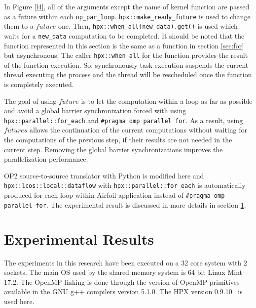 \documentclass[conference]{IEEEtran}
\begin{document}
In  Figure \ref{l4}, all of the arguments except the name of kernel function are passed as a future within each \texttt{op\_par\_loop}. \texttt{hpx::make\_ready\_future} is used to change them to a $future$ one. Then, \texttt{hpx::when\_all(new\_data).get()} is used which waits for a \texttt{new\_data} computation to be completed. It should be noted that the function represented in this section is the same as a function in section \ref{sec:for} but asynchronous. The caller \texttt{hpx::when\_all} for the function provides the result of the function execution. So, synchronously task execution suspends the current thread executing the process and the thread will be rescheduled once the function is completely executed. 


The goal of using $future$ is to let the computation within a loop as far as possible and avoid a global barrier synchronization forced with using  \texttt{hpx::parallel::for\_each} and \texttt{\#pragma omp parallel for}. As a result, using $futures$ allows the continuation of the current computations without waiting for the computations of the previous step, if their results are not needed in the current step. Removing the global barrier synchronizations improves the parallelization performance. 

OP2 source-to-source translator with Python is modified here and \texttt{hpx::lcos::local::dataflow} with  \texttt{hpx::parallel::for\_each} is automatically produced for each loop within Airfoil application instead of \texttt{\#pragma omp parallel for}. The experimental result is discussed in more details in section \ref{sec:res}.



\section{Experimental Results}
\label{sec:res}



The experiments in this research have been executed on a 32 core system with 2 sockets. The main OS used by the shared memory system is 64 bit Linux Mint 17.2. The OpenMP linking is done through the version of OpenMP primitives available in the GNU g++ compilers version 5.1.0. The HPX version 0.9.10~\cite{hpx_v0.9.11} is used here.
 
\end{document}
